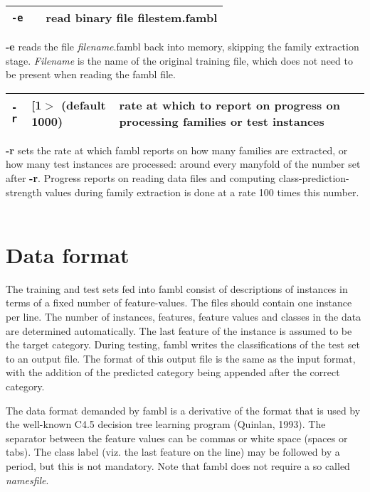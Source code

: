\documentclass[11pt]{article}
\begin{document}
\begin{tabular}{|p{}|p{}|p{}|}
\hline
{\tt -e} & & read binary file filestem.fambl \\
\hline
\end{tabular}

{\bf -e} reads the file {\sl filename}.fambl back into memory,
skipping the family extraction stage. {\sl Filename} is the name of
the original training file, which does not need to be present when
reading the {\sc fambl} file.  \ \\

\begin{tabular}{|p{}|p{}|p{}|}
\hline
{\tt -r} & [1$>$ (default 1000) & rate at which to report on progress on 
processing families or test instances \\
\hline
\end{tabular}

{\bf -r} sets the rate at which {\sc fambl} reports on how many
families are extracted, or how many test instances are processed:
around every manyfold of the number set after {\bf -r}. Progress
reports on reading data files and computing class-prediction-strength
values during family extraction is done at a rate 100 times this
number.  \ \\

\section{Data format}
\label{format}

The training and test sets fed into {\sc fambl} consist of
descriptions of instances in terms of a fixed number of
feature-values. The files should contain one instance per line. The
number of instances, features, feature values and classes in the data
are determined automatically. The last feature of the instance is
assumed to be the target category. During testing, {\sc fambl} writes
the classifications of the test set to an output file. The format of
this output file is the same as the input format, with the addition of
the predicted category being appended after the correct category.

The data format demanded by {\sc fambl} is a derivative of the format
that is used by the well-known C4.5 decision tree learning program
(Quinlan, 1993).  The separator between the feature values can be
commas or white space (spaces or tabs). The class label (viz.  the
last feature on the line) may be followed by a period, but this is not
mandatory. Note that {\sc fambl} does not require a so called {\em
  namesfile}.
\end{document}
